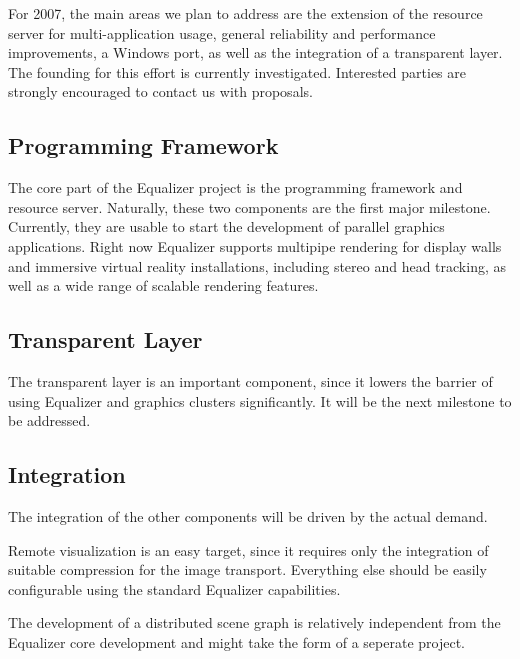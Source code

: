 \documentclass[10pt,a4paper]{scrartcl}
\begin{document}
For 2007, the main areas we plan to address are the extension of the
resource server for multi-application usage, general reliability and
performance improvements, a Windows port, as well as the integration of
a transparent layer. The founding for this effort is currently
investigated. Interested parties are strongly encouraged to contact us
with proposals.

\subsection{Programming Framework}
The core part of the Equalizer project is the programming framework and
resource server. Naturally, these two components are the first major
milestone. Currently, they are usable to start the development of
parallel graphics applications. Right now Equalizer supports multipipe
rendering for display walls and immersive virtual reality installations,
including stereo and head tracking, as well as a wide range of scalable
rendering features.

\subsection{Transparent Layer}
The transparent layer is an important component, since it lowers the
barrier of using Equalizer and graphics clusters significantly. It will
be the next milestone to be addressed.

\subsection{Integration}
The integration of the other components will be driven by the actual
demand.

Remote visualization is an easy target, since it requires only the
integration of suitable compression for the image transport. Everything
else should be easily configurable using the standard Equalizer
capabilities.

The development of a distributed scene graph is relatively independent
from the Equalizer core development and might take the form of a
seperate project.




\end{document}

